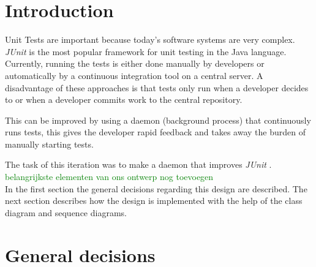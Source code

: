 \documentclass[i2]{oss}
\newcommand{\junit}{\emph{JUnit }}
\newcommand{\comment}[1]{{\huge \textcolor{green}{#1}}\\}
\begin{document}

\maketitlepage
\newpage
\tableofcontents
\pagebreak




\section*{Introduction}
\label{ssec:introduction}

Unit Tests are important because today's software systems are very 
complex.
\junit is the most popular framework for unit testing in the Java 
language.
Currently, running the tests is either done manually by developers or
automatically by a continuous integration tool on a central server.
A disadvantage of these approaches is that tests only run when a 
developer decides to or when a developer commits work to the central 
repository.

This can be improved by using a daemon (background process) that continuously runs tests, this gives the developer rapid feedback and 
takes away the burden of manually starting tests.

The task of this iteration was to make a daemon that improves \junit.
\comment{belangrijkste elementen van ons ontwerp nog toevoegen}

In the first section the general decisions regarding this design are described. The next section describes how the design is implemented with the help of the class diagram and sequence diagrams.

\section{General decisions}
\label{ssec:general-decisions}
\end{document}
